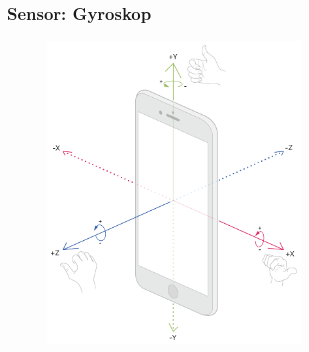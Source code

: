 \documentclass{beamer}
\begin{document}
\begin{frame}
    \frametitle{Sensor: Gyroskop} 
    \begin{figure}[htpb]
        \centering
        \includegraphics[width=0.6\textwidth]{gyro}
    \end{figure} 
\end{frame}
\end{document}

